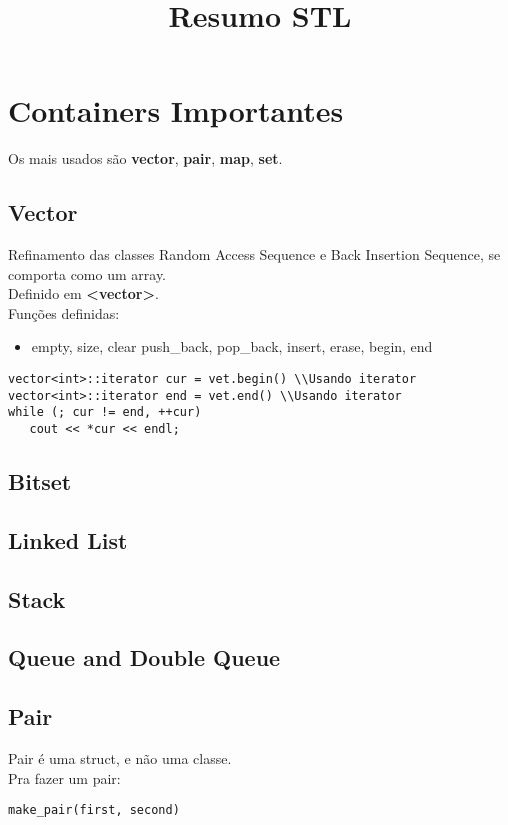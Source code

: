 \documentclass{article}
\title{Resumo STL}
\begin{document}
\maketitle

\section{Containers Importantes}
Os mais usados são \textbf{vector}, \textbf{pair}, \textbf{map}, \textbf{set}.

\subsection{Vector}
Refinamento das classes Random Access Sequence e Back Insertion Sequence, se
comporta como um array.\\
Definido em \textbf{<vector>}.\\

Funções definidas:
\begin{itemize}
   \item empty, size, clear push\_back, pop\_back, insert, erase, begin, end
\end{itemize}

\begin{lstlisting}
vector<int>::iterator cur = vet.begin() \\Usando iterator
vector<int>::iterator end = vet.end() \\Usando iterator
while (; cur != end, ++cur)
   cout << *cur << endl;
\end{lstlisting}

\subsection{Bitset}

\subsection{Linked List}

\subsection{Stack}

\subsection{Queue and Double Queue}

\subsection{Pair}
Pair é uma struct, e não uma classe.\\
Pra fazer um pair:
\begin{lstlisting}
make_pair(first, second)
\end{lstlisting}
\end{document}
